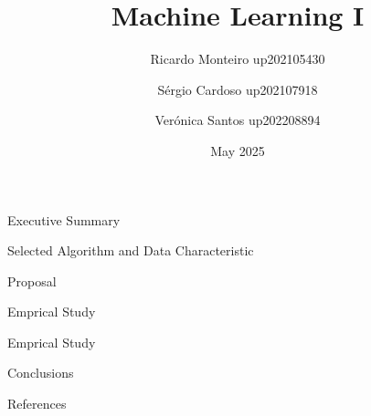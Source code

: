 \documentclass{beamer}
\title{Machine Learning I}
\author[Ricardo Figueiredo, Sérgio Cardoso, Verónica 
Santos]{Ricardo Monteiro up202105430 \and
    Sérgio Cardoso up202107918 \and
         Verónica Santos up202208894}
\date{May 2025}
\begin{document}
\maketitle

\begin{frame}{Executive Summary}
\end{frame}

\begin{frame}{Selected Algorithm and Data Characteristic}
\end{frame}

\begin{frame}{Proposal}
\end{frame}

\begin{frame}{Emprical Study}
\end{frame}

\begin{frame}{Emprical Study}
\end{frame}

\begin{frame}{Conclusions}
\end{frame}

\begin{frame}{References}
\end{frame}
\end{document}

